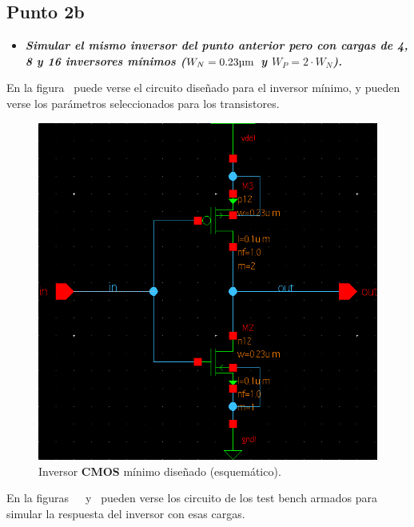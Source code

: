 
\subsection{Punto \textbf{2b}}

\begin{itemize}
\item \emph{\textbf{Simular el mismo inversor del punto anterior pero con cargas de \num{4}, \num{8} y \num{16} inversores mínimos ($W_{N} = 0.23 \si[per-mode=symbol]{\micro\meter}$ y $W_{P} = 2 \cdot W_{N}$).}}
\end{itemize}

En la figura~ puede verse el circuito diseñado para el inversor mínimo, y pueden verse los parámetros seleccionados para los transistores.




\begin{figure}[H] %
\begin{center}
\includegraphics[width=0.85 \textwidth, angle=0]{./img/point2/TEST_LOGIC_GATES_Inverter_load_schematic}
\caption{\label{fig:fig_inverter_minimum_schematic}\footnotesize{Inversor \textbf{CMOS} mínimo diseñado (esquemático).}}
\end{center}
\end{figure}


\clearpage


En la figuras~~~y~ pueden verse los circuito de los test bench armados para simular la respuesta del inversor con esas cargas.


